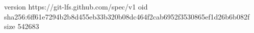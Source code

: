 version https://git-lfs.github.com/spec/v1
oid sha256:6ff61e7294b2b8d455eb33b320b08dc464f2cab6952f3530865ef1d26b6b082f
size 542683
